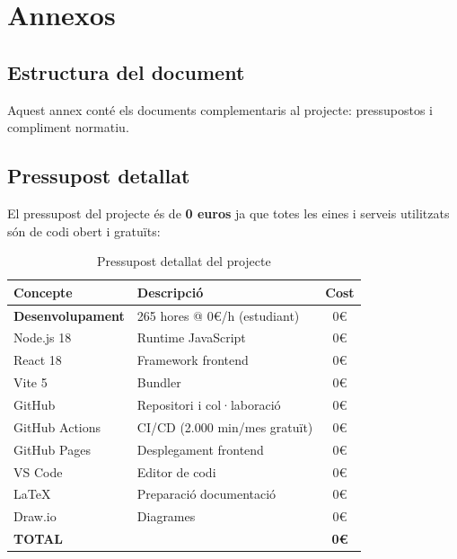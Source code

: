 

\chapter{Annexos}
\label{AppendixA}

\section{Estructura del document}

Aquest annex conté els documents complementaris al projecte: pressupostos i compliment normatiu.


\section{Pressupost detallat}

El pressupost del projecte és de \textbf{0 euros} ja que totes les eines i serveis utilitzats són de codi obert i gratuïts:

\begin{table}[h]
\centering
\caption{Pressupost detallat del projecte}
\begin{tabular}{|l|l|c|}
\hline
\textbf{Concepte} & \textbf{Descripció} & \textbf{Cost} \\
\hline
\textbf{Desenvolupament} & 265 hores @ 0€/h (estudiant) & 0€ \\
\hline
Node.js 18 & Runtime JavaScript & 0€ \\
\hline
React 18 & Framework frontend & 0€ \\
\hline
Vite 5 & Bundler & 0€ \\
\hline
GitHub & Repositori i col·laboració & 0€ \\
\hline
GitHub Actions & CI/CD (2.000 min/mes gratuït) & 0€ \\
\hline
GitHub Pages & Desplegament frontend & 0€ \\
\hline
VS Code & Editor de codi & 0€ \\
\hline
LaTeX & Preparació documentació & 0€ \\
\hline
Draw.io & Diagrames & 0€ \\
\hline
\textbf{TOTAL} & & \textbf{0€} \\
\hline
\end{tabular}
\end{table}

